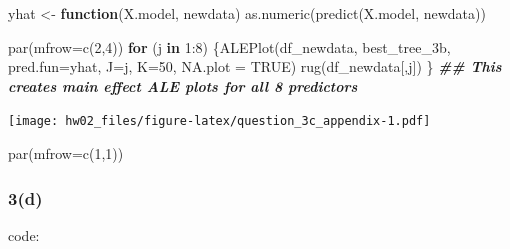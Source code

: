 \documentclass[
]{article}
\newenvironment{Shaded}{\begin{snugshade}}{\end{snugshade}}
\newcommand{\AttributeTok}[1]{\textcolor[rgb]{0.77,0.63,0.00}{#1}}
\newcommand{\CommentTok}[1]{\textcolor[rgb]{0.56,0.35,0.01}{\textit{#1}}}
\newcommand{\ConstantTok}[1]{\textcolor[rgb]{0.00,0.00,0.00}{#1}}
\newcommand{\ControlFlowTok}[1]{\textcolor[rgb]{0.13,0.29,0.53}{\textbf{#1}}}
\newcommand{\DecValTok}[1]{\textcolor[rgb]{0.00,0.00,0.81}{#1}}
\newcommand{\DocumentationTok}[1]{\textcolor[rgb]{0.56,0.35,0.01}{\textbf{\textit{#1}}}}
\newcommand{\FunctionTok}[1]{\textcolor[rgb]{0.00,0.00,0.00}{#1}}
\newcommand{\NormalTok}[1]{#1}
\newcommand{\OtherTok}[1]{\textcolor[rgb]{0.56,0.35,0.01}{#1}}
\newcommand{\SpecialCharTok}[1]{\textcolor[rgb]{0.00,0.00,0.00}{#1}}
\newcommand{\StringTok}[1]{\textcolor[rgb]{0.31,0.60,0.02}{#1}}
\begin{document}
\begin{Shaded}
\begin{Highlighting}[]
\NormalTok{yhat }\OtherTok{\textless{}{-}} \ControlFlowTok{function}\NormalTok{(X.model, newdata) }\FunctionTok{as.numeric}\NormalTok{(}\FunctionTok{predict}\NormalTok{(X.model, newdata))}

\FunctionTok{par}\NormalTok{(}\AttributeTok{mfrow=}\FunctionTok{c}\NormalTok{(}\DecValTok{2}\NormalTok{,}\DecValTok{4}\NormalTok{))}
\ControlFlowTok{for}\NormalTok{ (j }\ControlFlowTok{in} \DecValTok{1}\SpecialCharTok{:}\DecValTok{8}\NormalTok{)  \{}\FunctionTok{ALEPlot}\NormalTok{(df\_newdata, best\_tree\_3b, }\AttributeTok{pred.fun=}\NormalTok{yhat, }\AttributeTok{J=}\NormalTok{j, }\AttributeTok{K=}\DecValTok{50}\NormalTok{, }\AttributeTok{NA.plot =} \ConstantTok{TRUE}\NormalTok{)}
  \FunctionTok{rug}\NormalTok{(df\_newdata[,j]) \}  }\DocumentationTok{\#\# This creates main effect ALE plots for all 8 predictors}
\end{Highlighting}
\end{Shaded}

\texttt{[image: hw02\_files/figure-latex/question\_3c\_appendix-1.pdf]}

\begin{Shaded}
\begin{Highlighting}[]
\FunctionTok{par}\NormalTok{(}\AttributeTok{mfrow=}\FunctionTok{c}\NormalTok{(}\DecValTok{1}\NormalTok{,}\DecValTok{1}\NormalTok{))}
\end{Highlighting}
\end{Shaded}

\hypertarget{d-4}{%
\subsubsection{3(d)}\label{d-4}}

code:

\begin{Shaded}
\end{Shaded}
\end{document}

